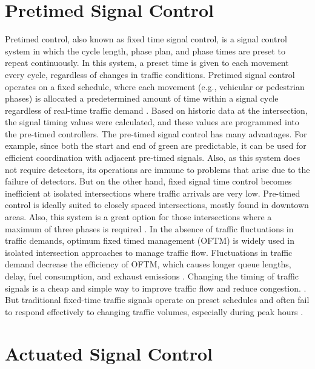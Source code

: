 \section{Pretimed Signal Control}

Pretimed control, also known as fixed time signal control, is a 
signal control system in which the cycle length, phase plan, and 
phase times are preset to repeat continuously. In this system, a 
preset time is given to each movement every cycle, regardless of 
changes in traffic conditions. Pretimed signal control operates on 
a fixed schedule, where each movement (e.g., vehicular or pedestrian 
phases) is allocated a predetermined amount of time within a 
signal cycle regardless of real-time traffic demand \cite{fhwa2007}. 
Based on historic data at the intersection, the signal timing values 
were calculated, and these values are programmed into the pre-timed 
controllers. The pre-timed signal control has many advantages. 
For example, since both the start and end of green are predictable, 
it can be used for efficient coordination with adjacent pre-timed 
signals. Also, as this system does not require detectors, its 
operations are immune to problems that arise due to the failure 
of detectors. But on the other hand, fixed signal time control 
becomes inefficient at isolated intersections where traffic 
arrivals are very low. Pre-timed control is ideally suited to 
closely spaced intersections, mostly found in downtown areas. 
Also, this system is a great option for those intersections where 
a maximum of three phases is required \cite{urbanik2015}. In 
the absence of traffic fluctuations in traffic demands, optimum 
fixed timed management (OFTM) is widely used in isolated intersection 
approaches to manage traffic flow. Fluctuations in traffic demand 
decrease the efficiency of OFTM, which causes longer queue lengths, 
delay, fuel consumption, and exhaust emissions  \cite{grether2011}. 
Changing the timing of traffic signals is a cheap and simple way 
to improve traffic flow and reduce congestion. \cite{fhwa2007}. But 
traditional fixed-time traffic signals operate on preset schedules 
and often fail to respond effectively to changing traffic volumes, 
especially during peak hours \cite{costa2018}.

\section{Actuated Signal Control}

